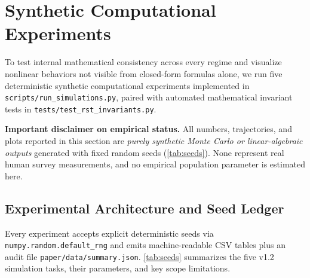 \section{Synthetic Computational Experiments}
\label{sec:simulations}

To test internal mathematical consistency across every regime and visualize nonlinear
behaviors not visible from closed-form formulas alone, we run five deterministic synthetic
computational experiments implemented in \texttt{scripts/run\_simulations.py}, paired with
automated mathematical invariant tests in \texttt{tests/test\_rst\_invariants.py}.

\noindent\textbf{Important disclaimer on empirical status.} All numbers, trajectories,
and plots reported in this section are \emph{purely synthetic Monte Carlo or linear-algebraic
outputs} generated with fixed random seeds (\cref{tab:seeds}). None represent real human
survey measurements, and no empirical population parameter is estimated here.

\subsection{Experimental Architecture and Seed Ledger}
\label{subsec:sim-protocol}

Every experiment accepts explicit deterministic seeds via \texttt{numpy.random.default\_rng}
and emits machine-readable CSV tables plus an audit file \texttt{paper/data/summary.json}.
\cref{tab:seeds} summarizes the five v1.2 simulation tasks, their parameters, and key scope
limitations.

